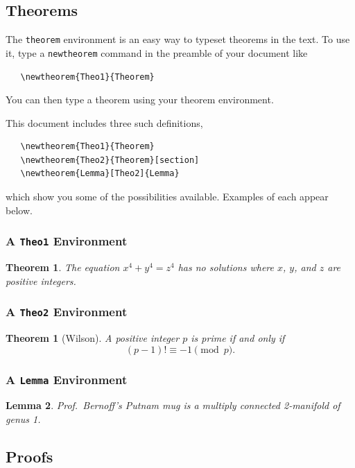 \documentclass{icmmcm}
\newtheorem{Theo1}{Theorem}
\newtheorem{Theo2}{Theorem}[section]
\newtheorem{Lemma}[Theo2]{Lemma}
\newcommand{\bslash}{\symbol{'134}}%
\newcommand{\bsl}{{\texttt{\bslash}}}
\newcommand{\com}[1]{\bsl\texttt{#1}\xspace}
\newcommand{\env}[1]{\texttt{#1}\xspace}
\begin{document}
{\subsection{Theorems}%
\label{sec:theorems}

The \env{theorem} environment is an easy way to typeset theorems in
the text.  To use it, type a \com{newtheorem} command in the preamble
of your document like
\begin{verbatim}
   \newtheorem{Theo1}{Theorem}
\end{verbatim}

You can then type a theorem using your theorem environment. 

This document includes three such definitions, 
\begin{verbatim}
   \newtheorem{Theo1}{Theorem}
   \newtheorem{Theo2}{Theorem}[section]
   \newtheorem{Lemma}[Theo2]{Lemma}
\end{verbatim}
which show you some of the possibilities available.  Examples of each
appear below.

\subsubsection{A \env{Theo1} Environment}

\begin{Theo1}
The equation $x^4 + y^4 = z^4$ has no solutions where $x$, $y$, and $z$ are
positive integers.
\end{Theo1}

\subsubsection{A \env{Theo2} Environment}

\begin{Theo2}[Wilson]
A positive integer $p$ is prime if and only if 
$$(p-1)! \equiv -1 \pmod{p}.$$
\end{Theo2}

\subsubsection{A \env{Lemma} Environment}

\begin{Lemma}
\label{mug}
Prof.~Bernoff's Putnam mug is a multiply connected 2-manifold of genus 1.
\end{Lemma}

\subsection{Proofs}%
\label{sec:proofs}

}
\end{document}
